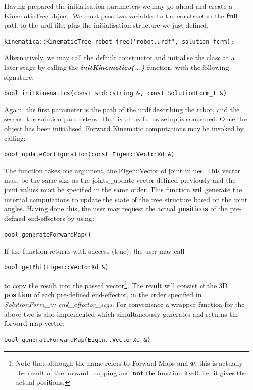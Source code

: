 \documentclass[12pt,a4paper,onecolumn]{article}
\begin{document}
\noindent Having prepared the initialisation parameters we may go ahead and create a KinematicTree object. We must pass two variables to the constructor: the \textbf{full} path to the urdf file, plus the initialisation structure we just defined.

\begin{lstlisting}
kinematica::KinematicTree robot_tree("robot.urdf", solution_form);
\end{lstlisting}
\noindent Alternatively, we may call the default constructor and initialise the class at a later stage by calling the \textbf{\textit{initKinematics(...)}} function, with the following signature:

\begin{lstlisting}
bool initKinematics(const std::string &, const SolutionForm_t &)
\end{lstlisting}
\noindent Again, the first parameter is the path of the urdf describing the robot, and the second the solution parameters. That is all as far as setup is concerned. Once the object has been initialised, Forward Kinematic computations may be invoked by calling:

\begin{lstlisting}
bool updateConfiguration(const Eigen::VectorXd &)
\end{lstlisting}
\noindent The function takes one argument, the Eigen::Vector of joint values. This vector must be the same size as the joints\_update vector defined previously and the joint values must be specified in the same order. This function will generate the internal computations to update the state of the tree structure based on the joint angles. Having done this, the user may request the actual \textbf{positions} of the pre-defined end-effectors by using:

\begin{lstlisting}
bool generateForwardMap()
\end{lstlisting}
\noindent If the function returns with success (true), the user may call
\begin{lstlisting}
bool getPhi(Eigen::VectorXd &)
\end{lstlisting}
to copy the result into the passed vector\footnote{Note that although the name refers to Forward Maps and $\Phi$, this is actually the result of the forward mapping and \textbf{not} the function itself: i.e. it gives the actual positions.}. The result will consist of the 3D \textbf{position} of each pre-defined end-effector, in the order specified in \textit{SolutionForm\_t::} \textit{end\_effector\_segs}. For convenience a wrapper function for the above two is also implemented which simultaneously generates and returns the forward-map vector:
\begin{lstlisting}
bool generateForwardMap(Eigen::VectorXd &)
\end{lstlisting}
\end{document}
